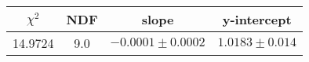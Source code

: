 \begin{tabular}{|c|c|c|c|}

\hline
$\chi^{2}$ & NDF & slope & y-intercept  \\
\hline
14.9724 & 9.0 & $-0.0001\pm0.0002$ & $1.0183\pm0.014$ \\
\hline

\end{tabular}